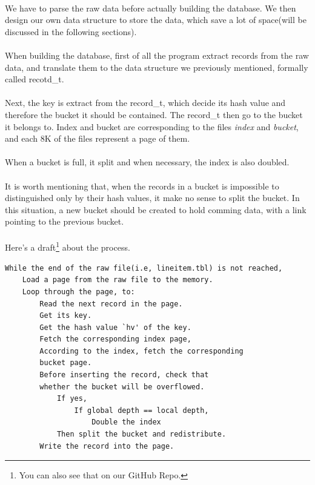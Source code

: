 \documentclass[a4paper, 12pt]{article}
\begin{document}
        \paragraph{}
            We have to parse the raw data before actually building the database. We then design our own data structure to store the data, which save a lot of space(will be discussed in the following sections).
        \paragraph{}
            When building the database, first of all the program extract records from the raw data, and translate them to the data structure we previously mentioned, formally called recotd\_t. 
        \paragraph{}
            Next, the key is extract from the record\_t, which decide its hash value and therefore the bucket it should be contained. The record\_t then go to the bucket it belongs to. Index and bucket are corresponding to the files \emph{index} and \emph{bucket}, and each 8K of the files represent a page of them.
        \paragraph{}
            When a bucket is full, it split and when necessary, the index is also doubled.
        \paragraph{}
            It is worth mentioning that, when the records in a bucket is impossible to distinguished only by their hash values, it make no sense to split the bucket. In this situation, a new bucket should be created to hold comming data, with a link pointing to the previous bucket.
        \paragraph{}
            Here's a draft\footnote{You can also see that on our GitHub Repo.} about the process.
\begin{verbatim}
While the end of the raw file(i.e, lineitem.tbl) is not reached, 
    Load a page from the raw file to the memory.
    Loop through the page, to:
        Read the next record in the page.
        Get its key.
        Get the hash value `hv' of the key.
        Fetch the corresponding index page,
        According to the index, fetch the corresponding
        bucket page.
        Before inserting the record, check that 
        whether the bucket will be overflowed.
            If yes,
                If global depth == local depth,
                    Double the index
            Then split the bucket and redistribute.
        Write the record into the page.

\end{verbatim}
\end{document}
